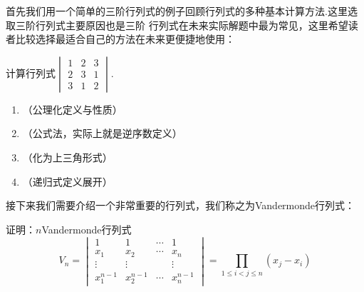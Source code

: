 首先我们用一个简单的三阶行列式的例子回顾行列式的多种基本计算方法.这里选取三阶行列式主要原因也是三阶
行列式在未来实际解题中最为常见，这里希望读者比较选择最适合自己的方法在未来更便捷地使用：
\begin{example}
    计算行列式$\begin{vmatrix}
        1 & 2 & 3 \\
        2 & 3 & 1 \\
        3 & 1 & 2
    \end{vmatrix}$.
\end{example}
\begin{solution}
\begin{enumerate}
    \item （公理化定义与性质）
    \item （公式法，实际上就是逆序数定义）
    \item （化为上三角形式）
    \item （递归式定义展开）
\end{enumerate}
\end{solution}

接下来我们需要介绍一个非常重要的行列式，我们称之为Vandermonde行列式：
\begin{example}
    证明：$n$Vandermonde行列式
    \[V_n=\begin{vmatrix}
        1 & 1 & \cdots & 1 \\
        x_1 & x_2 & \cdots & x_n \\
        \vdots & \vdots &  & \vdots \\
        x_1^{n-1} & x_2^{n-1} & \cdots & x_n^{n-1}
    \end{vmatrix}=\prod\limits_{1 \leqslant i < j \leqslant n}(x_j-x_i)\]
\end{example}

